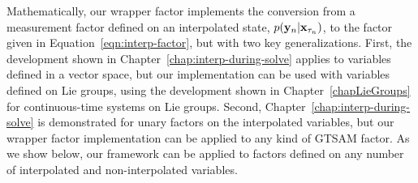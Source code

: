 Mathematically, our wrapper factor implements the conversion from a measurement factor defined on an interpolated state, $p(\mathbf{y}_n|\mathbf{x}_{\tau_n})$, to the factor given in Equation~\eqref{eqn:interp-factor}, but with two key generalizations. First, the development shown in Chapter~\ref{chap:interp-during-solve} applies to variables defined in a vector space, but our implementation can be used with variables defined on Lie groups, using the development shown in Chapter~\ref{chapLieGroups} for continuous-time systems on Lie groups. Second, Chapter~\ref{chap:interp-during-solve} is demonstrated for unary factors on the interpolated variables, but our wrapper factor implementation can be applied to any kind of \ac{GTSAM} factor. As we show below, our framework can be applied to factors defined on any number of interpolated and non-interpolated variables.

\newpage

